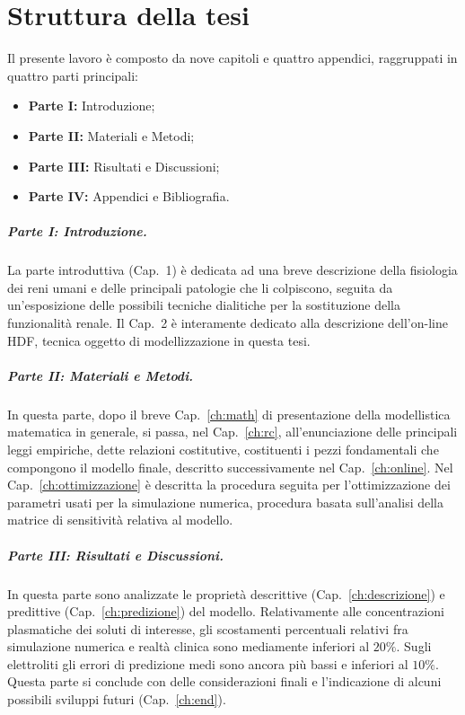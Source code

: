 \chapter*{Struttura della tesi}
Il presente lavoro è composto da nove capitoli e quattro appendici, raggruppati in quattro parti principali: 
\begin{itemize}
\item \textbf{Parte I:} Introduzione;
\item \textbf{Parte II:} Materiali e Metodi;
\item \textbf{Parte III:} Risultati e Discussioni;
\item \textbf{Parte IV:} Appendici e Bibliografia.
\end{itemize}
\paragraph{Parte I: Introduzione.}
La parte introduttiva (Cap.~1) è dedicata ad una breve descrizione della fisiologia dei reni umani e delle principali patologie che li colpiscono, seguita da un'esposizione delle possibili tecniche dialitiche per la sostituzione della funzionalità renale. Il Cap.~2 è interamente dedicato alla descrizione dell'on-line HDF, tecnica oggetto di modellizzazione in questa tesi.

\paragraph*{Parte II: Materiali e Metodi.}
In questa parte, dopo il breve Cap.~\ref{ch:math} di presentazione della modellistica matematica in generale, si passa, nel Cap.~\ref{ch:rc}, all'enunciazione delle principali leggi empiriche, dette relazioni costitutive, costituenti i pezzi fondamentali che compongono il modello finale, descritto successivamente nel Cap.~\ref{ch:online}.
Nel Cap.~\ref{ch:ottimizzazione} è descritta la procedura seguita per l'ottimizzazione dei parametri usati per la simulazione numerica, procedura basata sull'analisi della matrice di sensitività relativa al modello.

\paragraph*{Parte III: Risultati e Discussioni.}
In questa parte sono analizzate le proprietà descrittive (Cap.~\ref{ch:descrizione}) e predittive (Cap.~\ref{ch:predizione}) del modello. Relativamente alle concentrazioni plasmatiche dei soluti di interesse, gli scostamenti percentuali relativi fra simulazione numerica e realtà clinica sono mediamente inferiori al $20\%$. Sugli elettroliti gli errori di predizione medi sono ancora più bassi e inferiori al $10\%$. Questa parte si conclude con delle considerazioni finali e l'indicazione di alcuni possibili sviluppi futuri (Cap.~\ref{ch:end}).

